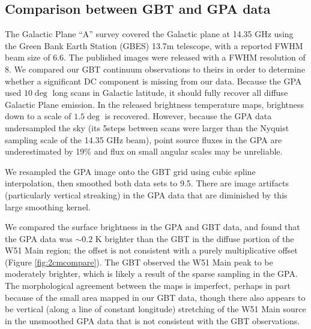 \subsection{Comparison between GBT and GPA data}
\label{sec:gpacompare}
The Galactic Plane ``A'' survey \citep{Langston2000a} covered the Galactic
plane at 14.35 GHz using the Green Bank Earth Station (GBES) 13.7m telescope,
with a reported FWHM beam size of 6.6\arcmin. %
The published images were released with a
FWHM resolution of 8\arcmin.  We compared our GBT
continuum observations to theirs in order to determine whether a significant DC
component is missing from our data.
Because the GPA used $10\deg$ long scans in Galactic latitude, it should fully
recover all diffuse Galactic Plane emission.  In the released brightness temperature
maps, brightness down to a scale of $1.5\deg$ is recovered.  However, because
the GPA data undersampled the sky (its 5\arcmin steps between scans were
larger than the Nyquist sampling scale of the 14.35 GHz beam), point source
fluxes in the GPA are underestimated by 19\% and flux on small angular scales
may be unreliable.


We resampled the GPA image onto the GBT grid using cubic spline interpolation,
then smoothed both data sets to 9.5\arcmin.  There are image artifacts
(particularly vertical streaking) in the GPA data that are diminished by this
large smoothing kernel.

We compared the surface brightness in the GPA and GBT data, and found that the
GPA data was $\sim0.2$ K brighter than the GBT in the diffuse portion of the
W51 Main region; the offset is not consistent with a purely multiplicative
offset (Figure \ref{fig:2cmcompare}).  The GBT observed the W51 Main peak to be
moderately brighter, which is likely a result of the sparse sampling in the
GPA.  The morphological agreement between the maps is imperfect, perhaps in
part because of the small area mapped in our GBT data, though there also
appears to be vertical (along a line of constant longitude) stretching of the
W51 Main source in the unsmoothed GPA data that is not consistent with the GBT
observations.


